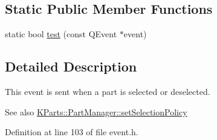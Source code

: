 \subsection*{\-Static \-Public \-Member \-Functions}
\begin{DoxyCompactItemize}
\item 
static bool \hyperlink{classKParts_1_1PartSelectEvent_acc477c171d8bedc9e9cbcc23cf775024}{test} (const \-Q\-Event $\ast$event)
\end{DoxyCompactItemize}


\subsection{\-Detailed \-Description}
\-This event is sent when a part is selected or deselected. \begin{DoxySeeAlso}{\-See also}
\hyperlink{classKParts_1_1PartManager_a1b9382654eab488363d5f96364dee7ec}{\-K\-Parts\-::\-Part\-Manager\-::set\-Selection\-Policy} 
\end{DoxySeeAlso}


\-Definition at line 103 of file event.\-h.



